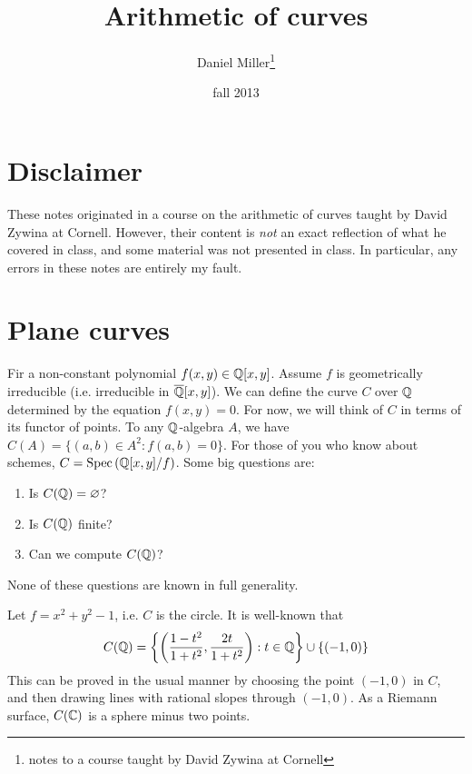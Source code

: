 \documentclass{article}
\title{Arithmetic of curves}
\author{Daniel Miller\thanks{notes to a course taught by David Zywina at Cornell}}
\date{fall 2013}
\begin{document}
\maketitle











\section*{Disclaimer}

These notes originated in a course on the arithmetic of curves taught by David 
Zywina at Cornell. However, their content is \emph{not} an exact reflection of 
what he covered in class, and some material was not presented in class. In 
particular, any errors in these notes are entirely my fault. 










\section{Plane curves}

Fir a non-constant polynomial $f(x,y)\in\mathbb{Q}[x,y]$. Assume $f$ is 
geometrically irreducible (i.e. irreducible in $\overline{\mathbb{Q}}[x,y]$). 
We can define the curve $C$ over $\mathbb{Q}$ determined by the equation 
$f(x,y)=0$. For now, we will think of $C$ in terms of its functor of points. 
To any $\mathbb{Q}$-algebra $A$, we have $C(A)=\{(a,b)\in A^2:f(a,b)=0\}$. 
For those of you who know about schemes, 
$C=\operatorname{Spec}\left(\mathbb{Q}[x,y]/f\right)$. Some big questions are:
\begin{enumerate}
  \item Is $C(\mathbb{Q})=\varnothing$?
  \item Is $C(\mathbb{Q})$ finite?
  \item Can we compute $C(\mathbb{Q})$?
\end{enumerate}
None of these questions are known in full generality. 

\begin{example}
Let $f=x^2+y^2-1$, i.e. $C$ is the circle. It is well-known that 
\[
  C(\mathbb{Q})=\left\{\left(\frac{1-t^2}{1+t^2},\frac{2t}{1+t^2}\right):t\in\mathbb{Q}\right\}\cup \{(-1,0)\}
\]
This can be proved in the usual manner by choosing the point 
$(-1,0)$ in $C$, and then drawing lines with rational slopes through 
$(-1,0)$. As a Riemann surface, $C(\mathbb{C})$ is a sphere minus 
two points. 
\end{example}
\end{document}
